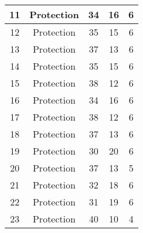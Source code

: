 \documentclass[results.tex]{subfiles}
\begin{document}
\begin{center}
\begin{tabular}{| c || c | c | c | c |}
            \hline
            11                      & Protection                   & 34                     & 16                      & 6                    \\
            \hline
            12                      & Protection                   & 35                     & 15                      & 6                    \\
            \hline
            13                      & Protection                   & 37                     & 13                      & 6                    \\
            \hline
            14                      & Protection                   & 35                     & 15                      & 6                    \\
            \hline
            15                      & Protection                   & 38                     & 12                      & 6                    \\
            \hline
            16                      & Protection                   & 34                     & 16                      & 6                    \\
            \hline
            17                      & Protection                   & 38                     & 12                      & 6                    \\
            \hline
            18                      & Protection                   & 37                     & 13                      & 6                    \\
            \hline
            19                      & Protection                   & 30                     & 20                      & 6                    \\
            \hline
            20                      & Protection                   & 37                     & 13                      & 5                    \\
            \hline
            21                      & Protection                   & 32                     & 18                      & 6                    \\
            \hline
            22                      & Protection                   & 31                     & 19                      & 6                    \\
            \hline
            23                      & Protection                   & 40                     & 10                      & 4                    \\

\end{tabular}
\end{center}
\end{document}
